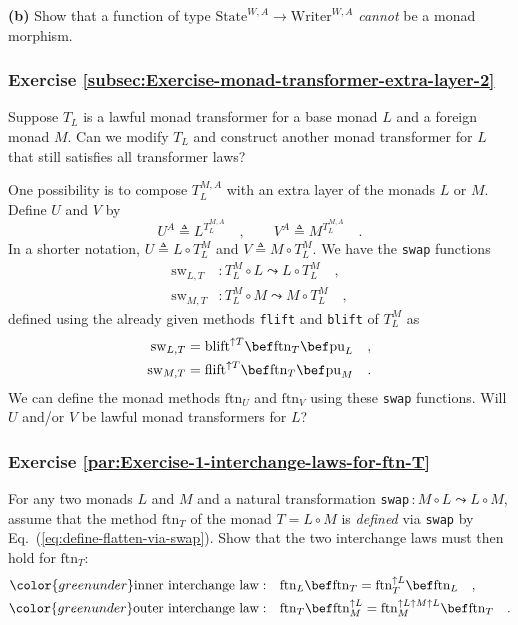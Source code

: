 \textbf{(b)} Show that a function of type $\text{State}^{W,A}\rightarrow\text{Writer}^{W,A}$
\emph{cannot} be a monad morphism.

\subsubsection{Exercise \label{subsec:Exercise-monad-transformer-extra-layer-2}\ref{subsec:Exercise-monad-transformer-extra-layer-2} }

Suppose $T_{L}$ is a lawful monad transformer for a base monad $L$
and a foreign monad $M$. Can we modify $T_{L}$ and construct another
monad transformer for $L$ that still satisfies all transformer laws?

One possibility is to compose $T_{L}^{M,A}$ with an extra layer of
the monads $L$ or $M$. Define $U$ and $V$ by
\[
U^{A}\triangleq L^{T_{L}^{M,A}}\quad,\quad\quad V^{A}\triangleq M^{T_{L}^{M,A}}\quad.
\]
In a shorter notation, $U\triangleq L\circ T_{L}^{M}$ and $V\triangleq M\circ T_{L}^{M}$.
We have the \lstinline!swap! functions 
\begin{align*}
\text{sw}_{L,T} & :T_{L}^{M}\circ L\leadsto L\circ T_{L}^{M}\quad,\\
\text{sw}_{M,T} & :T_{L}^{M}\circ M\leadsto M\circ T_{L}^{M}\quad,
\end{align*}
defined using the already given methods \lstinline!flift! and \lstinline!blift!
of $T_{L}^{M}$ as
\begin{align*}
\text{sw}_{L,T} & =\text{blift}^{\uparrow T}\bef\text{ftn}_{T}\bef\text{pu}_{L}\quad,\\
\text{sw}_{M,T} & =\text{flift}^{\uparrow T}\bef\text{ftn}_{T}\bef\text{pu}_{M}\quad.
\end{align*}
We can define the monad methods $\text{ftn}_{U}$ and $\text{ftn}_{V}$
using these \lstinline!swap! functions. Will $U$ and/or $V$ be
lawful monad transformers for $L$? 

\subsubsection{Exercise \label{par:Exercise-1-interchange-laws-for-ftn-T}\ref{par:Exercise-1-interchange-laws-for-ftn-T}}

For any two monads $L$ and $M$ and a natural transformation \lstinline!swap!$\,:M\circ L\leadsto L\circ M$,
assume that the method $\text{ftn}_{T}$ of the monad $T=L\circ M$
is \emph{defined} via \lstinline!swap! by Eq.~(\ref{eq:define-flatten-via-swap}).
Show that the two interchange laws must then hold for $\text{ftn}_{T}$:
\begin{align*}
{\color{greenunder}\text{inner interchange law}:}\quad & \text{ftn}_{L}\bef\text{ftn}_{T}=\text{ftn}_{T}^{\uparrow L}\bef\text{ftn}_{L}\quad,\\
{\color{greenunder}\text{outer interchange law}:}\quad & \text{ftn}_{T}\bef\text{ftn}_{M}^{\uparrow L}=\text{ftn}_{M}^{\uparrow L\uparrow M\uparrow L}\bef\text{ftn}_{T}\quad.
\end{align*}


